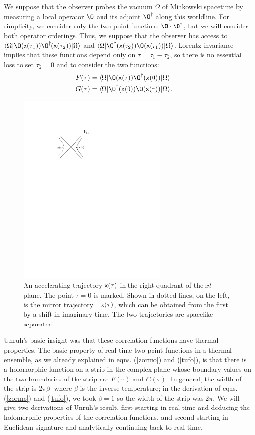 \documentclass[12pt]{article}
\def\x{{\sf x}}
\def\ra{\rangle}
\def\la{\langle}
\numberwithin{equation}{section}
\begin{document}
We suppose that the observer probes the vacuum $\Omega$ of Minkowski spacetime by measuring a local operator $\O$ and its adjoint $\O^\dagger$ along this worldline.
For simplicity, we consider only the two-point functions $\O\cdot \O^\dagger$, but we will consider both operator orderings.  
Thus,  we suppose that the observer has access to $\la\Omega|\O(\x(\tau_1))\O^\dagger(\x(\tau_2))|\Omega\ra$ and $\la\Omega|\O^\dagger(\x(\tau_2))
\O(\x(\tau_1))|\Omega\ra$.   Lorentz invariance implies that these functions depend only on $\tau=\tau_1-\tau_2$, so there is no essential loss to set $\tau_2=0$ and
to consider the two functions:
\begin{align}\label{zza} F(\tau) & = \la\Omega| \O(\x(\tau))\O^\dagger(\x(0))|\Omega\ra \cr
                                      G(\tau)& = \la\Omega|\O^\dagger(\x(0))\O(\x(\tau))|\Omega \ra .\end{align}
 \begin{figure}
 \begin{center}
   \includegraphics[width=2.9in]{Fig8.pdf}
 \end{center}
\caption{\small An accelerating trajectory ${\sf x}(\tau)$  in the right quadrant of the  $xt$ plane. The point $\tau=0$ is marked.
  Shown in dotted lines, on the left, is
the mirror trajectory $-{\sf x}(\tau)$, which can be obtained from the first by a shift in imaginary time.   The two trajectories are spacelike separated.    \label{Fig8}}
\end{figure}
 
 Unruh's basic insight was that these correlation functions have thermal properties.  The basic property of real time two-point
 functions in a thermal ensemble, as we already explained in   eqns. (\ref{zormo}) and (\ref{tufo}), is that there is a holomorphic function on a strip in the complex
 plane whose boundary values on the two boundaries of the strip are $F(\tau)$ and $G(\tau)$.   In general, the width of the strip is $2\pi\beta$, where $\beta$ is
 the inverse temperature; in the derivation of eqns. (\ref{zormo}) and (\ref{tufo}), we took $\beta=1$ so the width of the strip was $2\pi$.  We will give two
 derivations of Unruh's result, first starting in real time and deducing the holomorphic properties of the correlation functions, and second starting in Euclidean
 signature and analytically continuing back to real time.
 
\end{document}

